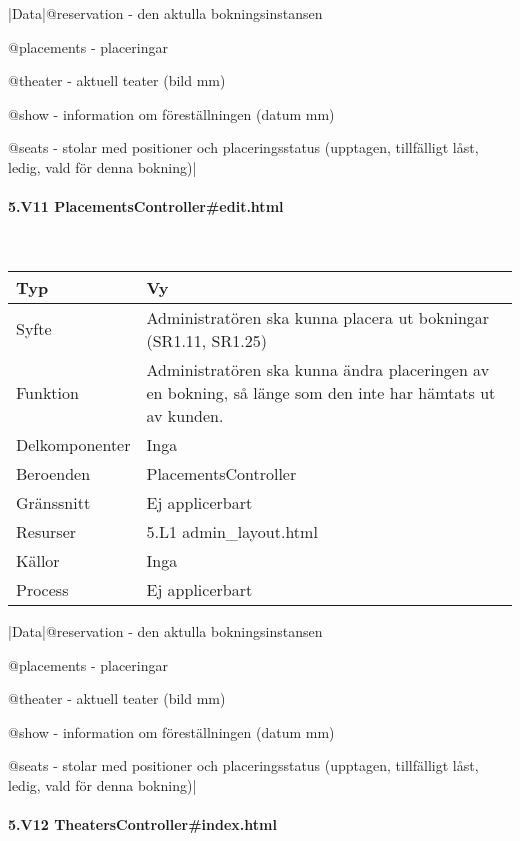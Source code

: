 \documentclass[a4paper, twoside, 11pt, titlepage]{article}
\begin{document}
			|Data|@reservation - den aktulla bokningsinstansen

			@placements - placeringar

			@theater - aktuell teater (bild mm)

			@show - information om föreställningen (datum mm)

			@seats - stolar med positioner och placeringsstatus (upptagen, tillfälligt låst, ledig, vald för denna bokning)|

			\paragraph{5.V11 PlacementsController\#edit.html}\

			\begin {table} [ht] \begin{tabular} {  p{3.5cm} p{9.6cm} }
				\hline
				Typ & Vy  \\
				\hline
				Syfte & Administratören ska kunna placera ut bokningar (SR1.11, SR1.25)  \\
				\hline
				Funktion & Administratören ska kunna ändra placeringen av en bokning, så länge som den inte har hämtats ut av kunden.  \\
				\hline
				Delkomponenter & Inga  \\
				\hline
				Beroenden & PlacementsController  \\
				\hline
				Gränssnitt & Ej applicerbart  \\
				\hline
				Resurser & 5.L1 admin\_layout.html  \\
				\hline
				Källor & Inga  \\
				\hline
				Process & Ej applicerbart  \\
				\hline
			\end{tabular} \end{table} \FloatBarrier
			\vspace{6mm}

			|Data|@reservation - den aktulla bokningsinstansen

			@placements - placeringar

			@theater - aktuell teater (bild mm)

			@show - information om föreställningen (datum mm)

			@seats - stolar med positioner och placeringsstatus (upptagen, tillfälligt låst, ledig, vald för denna bokning)|

			\paragraph{5.V12 TheatersController\#index.html}\
\end{document}
